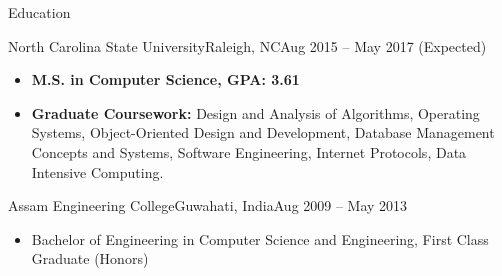 \documentclass[]{mcdowellcv}
\begin{document}
	\makeheader
	

\begin{cvsection}{Education}
		\begin{cvsubsection}{North Carolina State University}{Raleigh, NC}{Aug 2015 -- May 2017 (Expected)}
			\begin{itemize}
				\item \textbf{M.S. in Computer Science, GPA: 3.61}
				\item \textbf{Graduate Coursework:} Design and Analysis of Algorithms, Operating Systems, Object-Oriented Design and Development, Database Management Concepts and Systems, Software Engineering, Internet Protocols, Data Intensive Computing.
			\end{itemize}
		\end{cvsubsection}
		\begin{cvsubsection}{Assam Engineering College}{Guwahati, India}{Aug 2009 -- May 2013}
			\begin{itemize}
				\item Bachelor of Engineering in Computer Science and Engineering, First Class Graduate (Honors)
			\end{itemize}
		\end{cvsubsection}
	\end{cvsection}
\end{document}
